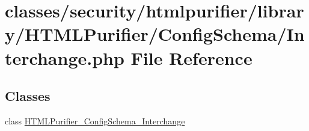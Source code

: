 \hypertarget{Interchange_8php}{\section{classes/security/htmlpurifier/library/\+H\+T\+M\+L\+Purifier/\+Config\+Schema/\+Interchange.php File Reference}
\label{Interchange_8php}
}
\subsection*{Classes}
\begin{DoxyCompactItemize}
\item 
class \hyperlink{classHTMLPurifier__ConfigSchema__Interchange}{H\+T\+M\+L\+Purifier\+\_\+\+Config\+Schema\+\_\+\+Interchange}
\end{DoxyCompactItemize}
